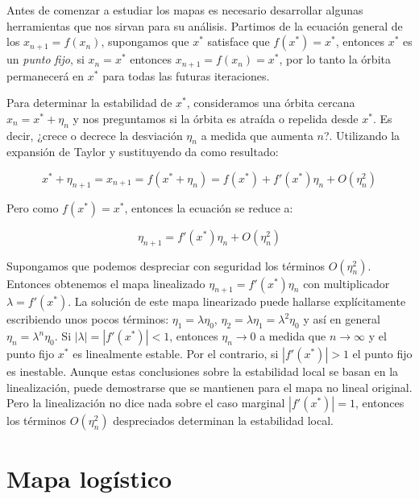         Antes de comenzar a estudiar los mapas es necesario desarrollar algunas herramientas que nos sirvan para su análisis. Partimos de la ecuación general de los  $x_{n+1} = f(x_{n})$, supongamos que $x^{*}$ satisface que $f(x^{*}) = x^{*} $, entonces $x^{*}$ es un \emph{punto fijo}, si $x_{n} = x^{*} $ entonces $x_{n+1} = f(x_{n}) = x^{*} $, por lo tanto la órbita permanecerá en $x^{*} $ para todas las futuras iteraciones. 

        Para determinar la estabilidad de $x^{*}$, consideramos una órbita cercana $x_{n} = x^{*} + \eta_{n} $ y nos preguntamos si la órbita es atraída o repelida desde $x^{*}$. Es decir, ¿crece o decrece la desviación $\eta_{n}$ a medida que aumenta $n$?. Utilizando la expansión de Taylor y sustituyendo da como resultado:

        \begin{equation}
            x^{*} + \eta_{n+1} = x_{n+1} = f(x^{*} + \eta_{n}) = f(x^{*}) + f'(x^{*}) \eta_{n} + O(\eta_{n}^{2})
        \end{equation}

        Pero como $f(x^{*}) = x^{*} $, entonces la ecuación se reduce a:

        \begin{equation}
            \eta_{n+1} = f'(x^{*}) \eta_{n} + O(\eta_{n}^{2})
        \end{equation}

        Supongamos que podemos despreciar con seguridad los términos $O(\eta_{n}^{2} )$. Entonces obtenemos el mapa linealizado $ \eta_{n+1} = f'(x^{*}) \eta_{n}$ con multiplicador $\lambda = f'(x^{*} )$. La solución de este mapa linearizado puede hallarse explícitamente escribiendo unos pocos términos: $\eta_{1} = \lambda \eta_{0}$, $\eta_{2} = \lambda \eta_{1} = \lambda^{2} \eta_{0} $ y así en general $\eta_{n} = \lambda^{n} \eta_{0} $. Si $|\lambda| = |f'(x^{*})| < 1$, entonces $\eta_{n} \to 0$ a medida que $n \to \infty$ y el punto fijo $x^{*}$ es linealmente estable. Por el contrario, si $|f'(x^{*})| > 1$ el punto fijo es inestable. Aunque estas conclusiones sobre la estabilidad local se basan en la linealización, puede demostrarse que se mantienen para el mapa no lineal original. Pero la linealización no dice nada sobre el caso marginal $|f'(x^{*})| = 1$, entonces los términos $O(\eta_{n}^{2} )$ despreciados determinan la estabilidad local.

    \section{Mapa logístico}

